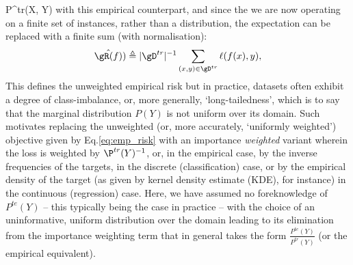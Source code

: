 P^{tr}(X, Y) \) with this empirical counterpart, and since the we are now operating on a finite set
of instances, rather than a distribution, the expectation can be replaced with a
finite sum (with normalisation):
%
\equ\begin{equation*} \label{eq:emp_risk} 
  \hat{\gR(f)}) \triangleq |\gD^{tr}|^{-1}  \sum_{(x, y) \in \gD^{tr}} \ell (f(x), y),
\end{equation*}
%
This defines the unweighted empirical risk but in practice, datasets often exhibit a degree of
class-imbalance, or, more generally, `long-tailedness', which is to say that the marginal
distribution \( P(Y) \) is not uniform over its domain.
%
Such motivates replacing the unweighted (or, more accurately, `uniformly weighted') objective
given by Eq.\ref{eq:emp_risk} with an importance  \emph{weighted} variant wherein the loss is
weighted by \( \P^{tr}(Y)^{-1} \), or, in the empirical case, by the inverse frequencies of the
targets, in the discrete (classification) case, or by the empirical density of the target (as given
by kernel density estimate (KDE), for instance) in the continuous (regression) case.
%
Here, we have assumed no foreknowledge of \( P^{te}(Y) \) -- this typically being the case in
practice -- with the choice of an uninformative, uniform distribution over the domain leading to
its elimination from the importance weighting term that in general takes the form \( \frac{
  P^{te}(Y) }{ P^{tr}(Y) } \) (or the empirical equivalent).

